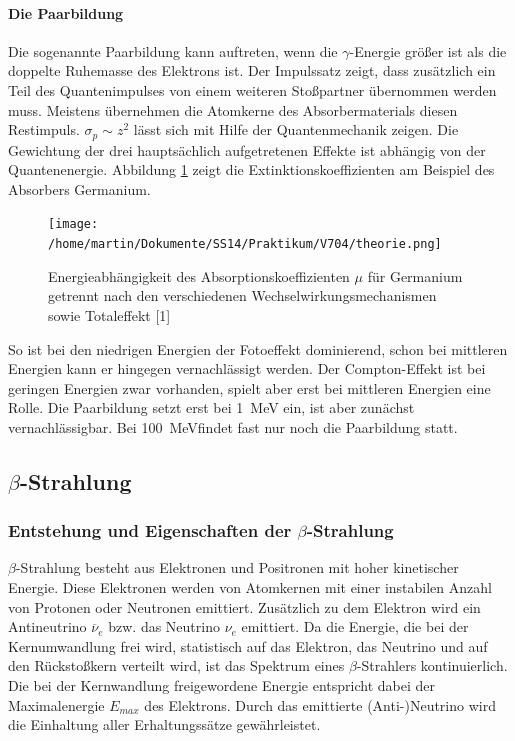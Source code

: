 \documentclass[11pt,ngerman,a4paper]{article}
\begin{document}
\paragraph{Die Paarbildung}
Die sogenannte Paarbildung kann auftreten, wenn die $\gamma$-Energie größer ist als die doppelte Ruhemasse des Elektrons ist.
Der Impulssatz zeigt, dass zusätzlich ein Teil des Quantenimpulses von einem weiteren Stoßpartner übernommen werden muss. Meistens übernehmen die Atomkerne des Absorbermaterials diesen Restimpuls. $\sigma_p \sim z^2$ lässt sich mit Hilfe der Quantenmechanik zeigen.
\newline\newline
Die Gewichtung der drei hauptsächlich aufgetretenen Effekte ist abhängig von der Quantenenergie. Abbildung \ref{a1} zeigt die Extinktionskoeffizienten am Beispiel des Absorbers Germanium. 
\begin{figure}[h!]
\centering
\texttt{[image: /home/martin/Dokumente/SS14/Praktikum/V704/theorie.png]}
\caption{Energieabhängigkeit des Absorptionskoeffizienten $\mu$ für Germanium getrennt nach den verschiedenen Wechselwirkungsmechanismen sowie Totaleffekt [1]}
\label{a1}
\end{figure}
So ist bei den niedrigen Energien der Fotoeffekt dominierend, schon bei mittleren Energien kann er hingegen vernachlässigt werden. Der Compton-Effekt ist bei geringen Energien zwar vorhanden, spielt aber erst bei mittleren Energien eine Rolle. Die Paarbildung setzt erst bei \SI{1}{MeV} ein, ist aber zunächst vernachlässigbar. Bei \SI{100}{MeV}findet fast nur noch die Paarbildung statt.
\subsection{$\beta$-Strahlung}
\subsubsection{Entstehung und Eigenschaften der $\beta$-Strahlung}
$\beta$-Strahlung besteht aus Elektronen und Positronen mit hoher kinetischer Energie. Diese Elektronen werden von Atomkernen mit einer instabilen Anzahl von Protonen oder Neutronen emittiert. Zusätzlich zu dem Elektron wird ein Antineutrino $\overline{\nu}_e$ bzw. das Neutrino $\nu_e$ emittiert. Da die Energie, die bei der Kernumwandlung frei wird, statistisch auf das Elektron, das Neutrino und auf den Rückstoßkern verteilt wird, ist das Spektrum eines $\beta$-Strahlers kontinuierlich. Die bei der Kernwandlung freigewordene Energie entspricht dabei der Maximalenergie $E_{max}$ des Elektrons. Durch das emittierte (Anti-)Neutrino wird die Einhaltung aller Erhaltungssätze gewährleistet.
\end{document}
